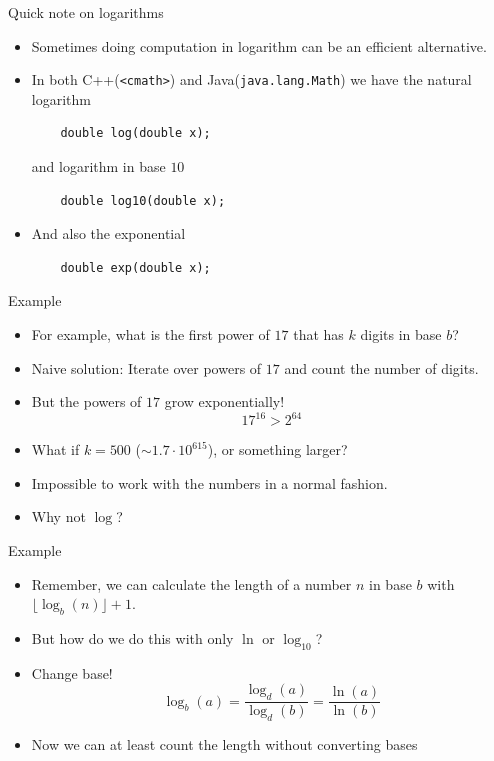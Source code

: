 \documentclass{beamer}
\begin{document}
\begin{frame}{Quick note on logarithms}
  \vspace{30pt}
  \begin{itemize}
    \item Sometimes doing computation in logarithm can be an efficient alternative.

  \item In both C++(\texttt{<cmath>}) and
    Java(\texttt{java.lang.Math}) we have the natural logarithm
      \begin{verbatim}
    double log(double x);
      \end{verbatim}

      and logarithm in base $10$
      \begin{verbatim}
    double log10(double x);
      \end{verbatim}
  \item And also the exponential
    \begin{verbatim}
    double exp(double x);
    \end{verbatim}
  \end{itemize}
\end{frame}

\begin{frame}{Example}
  \vspace{20pt}
  \begin{itemize}
    \item For example, what is the first power of $17$ that has $k$ digits in base $b$?
    \item Naive solution: Iterate over powers of $17$ and count the number of digits.
    \item But the powers of $17$ grow exponentially!
      \[17^{16} > 2^{64}\]
    \item What if $k = 500$ ($\sim1.7 \cdot 10^{615}$), or something larger?
    \item Impossible to work with the numbers in a normal fashion.
    \item Why not $\log$?
  \end{itemize}
\end{frame}

\begin{frame}{Example}
  \vspace{40pt}
  \begin{itemize}
    \item Remember, we can calculate the length of a number $n$ in base $b$
      with $\lfloor \log_b(n) \rfloor + 1$.
    \item But how do we do this with only $\ln$ or $\log_{10}$?
    \item Change base!
      \[
        \log_b(a) = \frac{\log_d(a)}{\log_d(b)} = \frac{\ln(a)}{\ln(b)}
      \]
    \item Now we can at least count the length without converting bases
  \end{itemize}
\end{frame}
\end{document}

